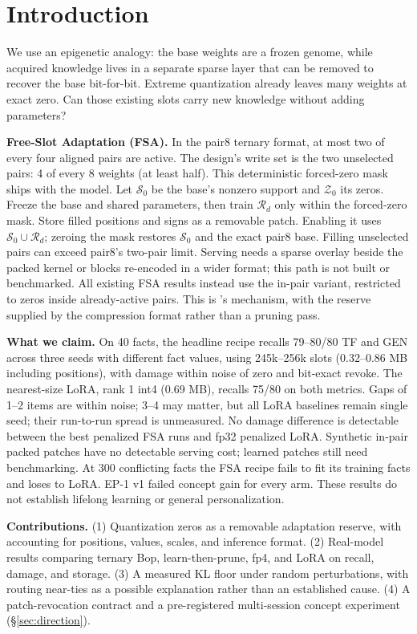 \documentclass[11pt]{article}
\newcommand{\Sz}{\mathcal{S}_0}
\newcommand{\Zz}{\mathcal{Z}_0}
\newcommand{\Rd}{\mathcal{R}_d}
\begin{document}
\section{Introduction}
We use an epigenetic analogy: the base weights are a frozen genome, while acquired knowledge lives in
a separate sparse layer that can be removed to recover the base bit-for-bit. Extreme quantization
already leaves many weights at exact zero. Can those existing slots carry new knowledge without
adding parameters?

\textbf{Free-Slot Adaptation (FSA).} In the pair8 ternary format, at most two of every four aligned
pairs are active. The design's write set is the two unselected pairs: 4 of every 8 weights
(at least half). This deterministic forced-zero mask ships with the model. Let $\Sz$ be the
base's nonzero support and $\Zz$ its zeros. Freeze the base and shared parameters, then train
$\Rd$ only within the forced-zero mask. Store filled positions and signs as a removable patch.
Enabling it uses $\Sz\cup\Rd$; zeroing the mask restores $\Sz$ and the exact pair8 base.
Filling unselected pairs can exceed pair8's two-pair limit. Serving needs a sparse overlay beside
the packed kernel or blocks re-encoded in a wider format; this path is not built or benchmarked.
All existing FSA results instead use the in-pair variant, restricted to zeros inside
already-active pairs. This is \citet{packnet}'s mechanism, with the reserve supplied by the
compression format rather than a pruning pass.

\textbf{What we claim.} On 40 facts, the headline recipe recalls 79--80/80 TF and GEN across
three seeds with different fact values, using 245k--256k slots (0.32--0.86 MB including positions), with damage within noise of
zero and bit-exact revoke. The nearest-size LoRA, rank 1 int4 (0.69 MB), recalls 75/80 on both
metrics. Gaps of 1--2 items are within noise; 3--4 may matter, but all LoRA baselines remain single seed; their
run-to-run spread is unmeasured. No damage difference is detectable between the best penalized
FSA runs and fp32 penalized LoRA. Synthetic in-pair packed patches have no detectable serving cost;
learned patches still need benchmarking. At 300 conflicting facts the FSA recipe fails to fit its
training facts and loses to LoRA. EP-1 v1 failed concept gain for every arm. These results do not
establish lifelong learning or general personalization.

\textbf{Contributions.} (1) Quantization zeros as a removable adaptation reserve, with accounting for
positions, values, scales, and inference format. (2) Real-model results comparing ternary Bop,
learn-then-prune, fp4, and LoRA on recall, damage, and storage. (3) A measured KL floor under random
perturbations, with routing near-ties as a possible explanation rather than an established cause.
(4) A patch-revocation contract and a pre-registered multi-session concept experiment
(\S\ref{sec:direction}).
\end{document}
